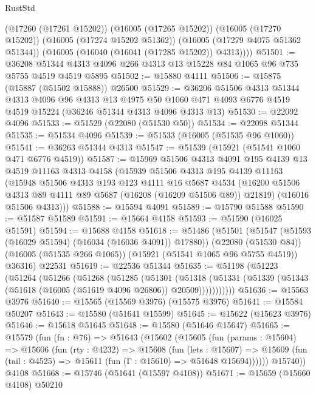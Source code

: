 \begin{lexlean}{RustStd}
\begin{coremodule}
        (@17260 (@17261 @15202))
        (@16005 (@17265 @15202))
        (@16005 (@17270 @15202))
        (@16005 (@17274 @15202 @51362))
        (@16005 (@17279 @4075 @51362 @51344))
        (@16005 (@16040 (@16041 (@17285 @15202)) @4313))))
@51501 := @36208 @51344 @4313 @4096 @266 @4313 @13 @15228 @84 @1065 @96 @735 @5755 @4519 @4519 @5895
@51502 := @15880 @4111
@51506 := @15875 (@15887 (@51502 @15888)) @26500
@51529 := @36206
    @51506
    @4313
    @51344
    @4313
    @4096
    @96
    @4313
    @13
    @4975
    @50
    @1060
    @471
    @4093
    @6776
    @4519
    @4519
    @15224
    (@36246 @51344 @4313 @4096 @4313 @13)
@51530 := @22092 @4096
@51533 := @51529 (@22080 (@51530 @50))
@51534 := @22098 @51344
@51535 := @51534 @4096
@51539 := @51533 (@16005 (@51535 @96 @1060))
@51541 := @36263 @51344 @4313
@51547 := @51539 (@15921 (@51541 @1060 @471 @6776 @4519))
@51587 := @15969
    @51506
    @4313
    @4091
    @195
    @4139
    @13
    @4519
    @11163
    @4313
    @4158
    (@15939
      @51506
      @4313
      @195
      @4139
      @11163
      (@15948
        @51506
        @4313
        @193
        @123
        @4111
        @16
        @5687
        @4534
        (@16200 @51506 @4313 @89 @4111 @89 @5687 (@16208 (@16209 @51506 @89)) @21819)
        (@16016 @51506 @4313)))
@51588 := @15594 @4091
@51589 := @15790 @51588
@51590 := @51587 @51589
@51591 := @15664 @4158
@51593 := @51590 (@16025 @51591)
@51594 := @15688 @4158
@51618 := @51486
    (@51501
      (@51547 (@51593 (@16029 @51594) (@16034 (@16036 @4091)) @17880))
      (@22080 (@51530 @84))
      (@16005 (@51535 @266 @1065))
      (@15921 (@51541 @1065 @96 @5755 @4519))
      @36316)
    @22531
@51619 := @22536 @51344
@51635 := @51198
    (@51223
      (@51264
        (@51266
          (@51268
            (@51285
              (@51301
                (@51318
                  (@51331 (@51339 (@51343 (@51618 (@16005 (@51619 @4096 @26806)) @20509)))))))))))
@51636 := @15563 @3976
@51640 := @15565 (@15569 @3976) (@15575 @3976)
@51641 := @15584 @50207
@51643 := @15580 (@51641 @15599)
@51645 := @15622 (@15623 @3976)
@51646 := @15618 @51645
@51648 := @15580 (@51646 @15647)
@51665 := @15579
    (fun (fn : @76) =>
    @51643
      (@15602
        (@15605
          (fun (params : @15604) =>
          @15606
            (fun (rty : @4232) =>
            @15608
              (fun (lets : @15607) =>
              @15609 (fun (tail : @4525) => @15611 (fun (Γ : @15610) => @51648 @15694))))))
        @15740))
    @4108
@51668 := @15746 (@51641 (@15597 @4108))
@51671 := @15659 (@15660 @4108) @50210

\end{coremodule}
\end{lexlean}
